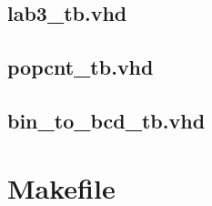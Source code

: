 \documentclass{article}
\begin{document}
\subsection{lab3\_tb.vhd}

\subsection{popcnt\_tb.vhd}

\subsection{bin\_to\_bcd\_tb.vhd}


\newpage
\section{Makefile}

\end{document}
